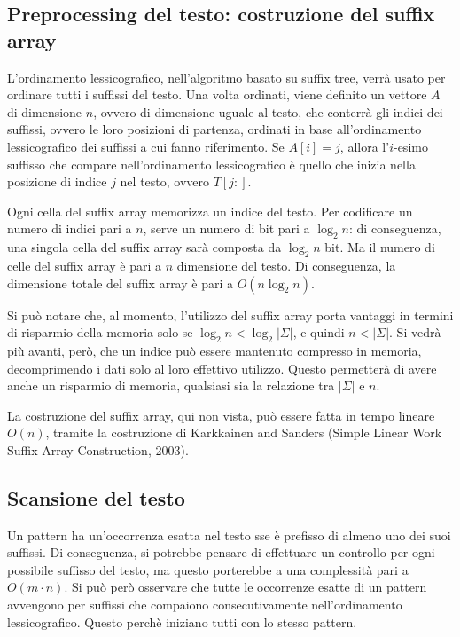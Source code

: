 \subsection{Preprocessing del testo: costruzione del suffix array}
L'ordinamento lessicografico, nell'algoritmo basato su suffix tree, verrà usato per ordinare tutti i suffissi del testo.
Una volta ordinati, viene definito un vettore $A$ di dimensione $n$, ovvero di dimensione uguale al testo, che conterrà gli indici dei suffissi, ovvero le loro posizioni di partenza, ordinati in base all'ordinamento lessicografico dei suffissi a cui fanno riferimento.
Se $A[i] = j$, allora l'$i$-esimo suffisso che compare nell'ordinamento lessicografico è quello che inizia nella posizione di indice $j$ nel testo, ovvero $T[j:]$.

Ogni cella del suffix array memorizza un indice del testo. Per codificare un numero di indici pari a $n$, serve un numero di bit pari a $\log_2 n$: di conseguenza, una singola cella del suffix array sarà composta da $\log_2 n$ bit.
Ma il numero di celle del suffix array è pari a $n$ dimensione del testo.
Di conseguenza, la dimensione totale del suffix array è pari a $O(n \log_2 n)$.

Si può notare che, al momento, l'utilizzo del suffix array porta vantaggi in termini di risparmio della memoria solo se $\log_2 n < \log_2 |\Sigma|$, e quindi $n < |\Sigma|$.
Si vedrà più avanti, però, che un indice può essere mantenuto compresso in memoria, decomprimendo i dati solo al loro effettivo utilizzo. Questo permetterà di avere anche un risparmio di memoria, qualsiasi sia la relazione tra $|\Sigma|$ e $n$.

La costruzione del suffix array, qui non vista, può essere fatta in tempo lineare $O(n)$, tramite la costruzione di Karkkainen and Sanders (Simple Linear Work Suffix Array Construction, 2003).

\subsection{Scansione del testo}
Un pattern ha un'occorrenza esatta nel testo sse è prefisso di almeno uno dei suoi suffissi.
Di conseguenza, si potrebbe pensare di effettuare un controllo per ogni possibile suffisso del testo, ma questo porterebbe a una complessità pari a $O(m \cdot n)$.
Si può però osservare che tutte le occorrenze esatte di un pattern avvengono per suffissi che compaiono consecutivamente nell'ordinamento lessicografico.
Questo perchè iniziano tutti con lo stesso pattern.

